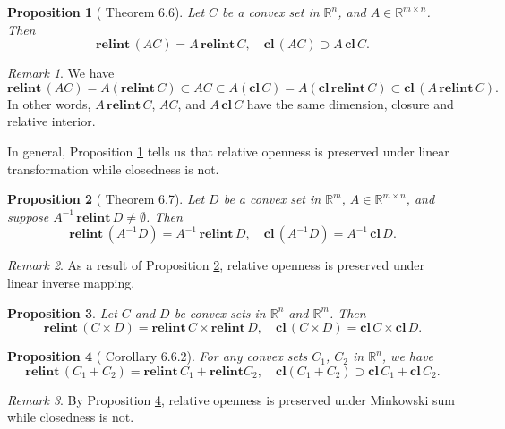 \documentclass[openany]{book}
\newtheorem{proposition}{Proposition}[chapter]
\theoremstyle{definition}
\theoremstyle{remark}
\newtheorem*{remark}{Remark}
\begin{document}
\begin{proposition}[\cite{R15} Theorem 6.6]\label{prop:clRelIntLinMap}
    Let $C$ be a convex set in $\mathbb{R}^n$, and $A\in \mathbb{R}^{m\times n}$. Then
    \begin{equation*}
        \mathbf{relint}\,(AC)=A\,\mathbf{relint}\,C,\quad \mathbf{cl}\,(AC)\supset A\,\mathbf{cl}\,C.
    \end{equation*}
\end{proposition}
\begin{remark}
    We have
    \begin{equation*}
        \mathbf{relint}\,(AC)=A(\mathbf{relint}\,C)\subset AC\subset A(\mathbf{cl}\,C)=A(\mathbf{cl}\,\mathbf{relint}\,C)\subset \mathbf{cl}\,(A\,\mathbf{relint}\,C).
    \end{equation*}
    In other words, $A\,\mathbf{relint}\,C$, $AC$, and $A\,\mathbf{cl}\,C$ have the same dimension, closure and relative interior.

    In general, Proposition \ref{prop:clRelIntLinMap} tells us that relative openness is preserved under linear transformation while closedness is not.
\end{remark}
\begin{proposition}[\cite{R15} Theorem 6.7]\label{prop:clRelIntLinInvMap}
    Let $D$ be a convex set in $\mathbb{R}^m$, $A\in \mathbb{R}^{m\times n}$, and suppose $A^{-1}\,\mathbf{relint}\,D\ne\emptyset$. Then
    \begin{equation*}
        \mathbf{relint}\,(A^{-1}D)=A^{-1}\,\mathbf{relint}\,D,\quad \mathbf{cl}\,(A^{-1}D)=A^{-1}\,\mathbf{cl}\,D.
    \end{equation*}
\end{proposition}
\begin{remark}
    As a result of Proposition \ref{prop:clRelIntLinInvMap}, relative openness is preserved under linear inverse mapping.
\end{remark}
\begin{proposition}
    Let $C$ and $D$ be convex sets in $\mathbb{R}^n$ and $\mathbb{R}^m$. Then
    \begin{equation*}
        \mathbf{relint}\,(C\times D)=\mathbf{relint}\,C\times \mathbf{relint}\,D,\quad \mathbf{cl}\,(C\times D)=\mathbf{cl}\,C\times \mathbf{cl}\,D.
    \end{equation*}
\end{proposition}
\begin{proposition}[\cite{R15} Corollary 6.6.2]\label{prop:clRelIntMinkowskiSum}
    For any convex sets $C_1$, $C_2$ in $\mathbb{R}^n$, we have
    \begin{equation*}
        \mathbf{relint}\,(C_1+C_2)=\mathbf{relint}\,C_1+\mathbf{relint}C_2,\quad \mathbf{cl}(C_1+C_2)\supset\mathbf{cl}\,C_1+\mathbf{cl}\,C_2.
    \end{equation*}
\end{proposition}
\begin{remark}
    By Proposition \ref{prop:clRelIntMinkowskiSum}, relative openness is preserved under Minkowski sum while closedness is not.
\end{remark}
\end{document}
